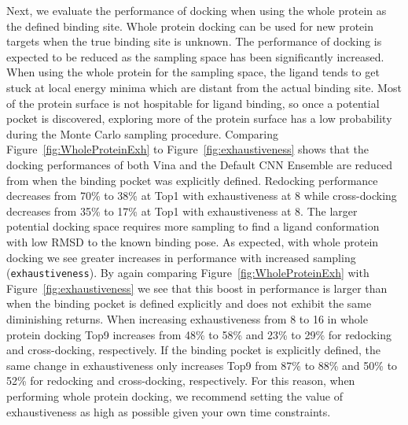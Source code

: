 \documentclass[journal=jcisd8,manuscript=article]{achemso}
\begin{document}
Next, we evaluate the performance of docking when using the whole protein as the defined binding site. Whole protein docking can be used for new protein targets when the true binding site is unknown. The performance of docking is expected to be reduced as the sampling space has been significantly increased. When using the whole protein for the sampling space, the ligand  tends to get stuck at local energy minima which are distant from the actual binding site. Most of the protein surface is not hospitable for ligand binding, so once a potential pocket is discovered, exploring more of the protein surface has a low probability during the Monte Carlo sampling procedure. Comparing Figure~\ref{fig:WholeProteinExh} to Figure~\ref{fig:exhaustiveness} shows that the docking performances of both Vina and the Default CNN Ensemble are reduced from when the binding pocket was explicitly defined. Redocking performance decreases from 70\% to 38\% at Top1 with exhaustiveness at 8 while cross-docking decreases from 35\% to 17\% at Top1 with exhaustiveness at 8. The larger potential docking space requires more sampling to find a ligand conformation with low RMSD to the known binding pose. As expected, with whole protein docking we see greater increases in performance with increased sampling (\texttt{exhaustiveness}). By again comparing Figure~\ref{fig:WholeProteinExh} with Figure~\ref{fig:exhaustiveness} we see that this boost in performance is larger than when the binding pocket is defined explicitly and does not exhibit the same diminishing returns. When increasing exhaustiveness from 8 to 16 in whole protein docking Top9 increases from 48\% to 58\% and 23\% to 29\% for redocking and cross-docking, respectively. If the binding pocket is explicitly defined, the same change in exhaustiveness only increases Top9 from 87\% to 88\% and 50\% to 52\% for redocking and cross-docking, respectively. For this reason, when performing whole protein docking, we recommend setting the value of exhaustiveness as high as possible given your own time constraints.
\end{document}
